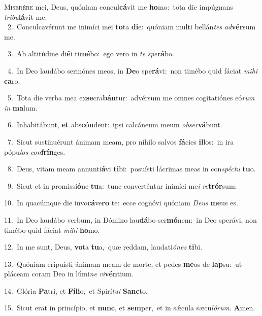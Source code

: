 \lettrine{\initial\textcolor{\initialcolor}{M}}{iserére} mei, Deus, quóniam concul\-\textbf{cá}\-vit me \textbf{ho}\-mo:~\star tota die impúgnans \textit{tri}\-\textit{bu}\textbf{lá}vit me.\\
{\numbfont\textcolor{\numbcolor}{~2.}}~Conculcavérunt me inimíci mei \textbf{to}\-ta \textbf{di}\-e:~\star quóniam multi bellán\textit{tes} \textit{ad}\-\textbf{vér}sum me.\par
{\numbfont\textcolor{\numbcolor}{~3.}}~Ab altitúdine di\-\textbf{é}\-i ti\-\textbf{mé}\-bo:~\star ego vero in \textit{te} \textit{spe}\-\textbf{rá}bo.\par
{\numbfont\textcolor{\numbcolor}{~4.}}~In Deo laudábo sermónes meos, in \textbf{De}\-o spe\-\textbf{rá}\-vi:~\star non timébo quid fáciat \textit{mi}\-\textit{hi} \textbf{ca}\-ro.\par
{\numbfont\textcolor{\numbcolor}{~5.}}~Tota die verba mea ex\-\textbf{se}\-cra\-\textbf{bán}\-tur:~\star advérsum me omnes cogitatiónes eó\textit{rum} \textit{in} \textbf{ma}\-lum.\par
{\numbfont\textcolor{\numbcolor}{~6.}}~Inhabitábunt, \textbf{et} abs\-\textbf{cón}\-dent:~\star ipsi calcáneum meum \textit{ob}\-\textit{ser}\textbf{vá}bunt.\par
{\numbfont\textcolor{\numbcolor}{~7.}}~Sicut sustinuérunt ánimam meam, pro níhilo salvos \textbf{fá}\-cies \textbf{il}\-los:~\star in ira pópu\textit{los} \textit{con}\-\textbf{frín}ges.\par
{\numbfont\textcolor{\numbcolor}{~8.}}~Deus, vitam meam annunti\-\textbf{á}\-vi \textbf{ti}\-bi:~\star posuísti lácrimas meas in con\-\textit{spéc}\-\textit{tu} \textbf{tu}\-o.\par
{\numbfont\textcolor{\numbcolor}{~9.}}~Sicut et in promissi\-\textbf{ó}\-ne \textbf{tu}\-a:~\star tunc converténtur inimíci me\textit{i} \textit{re}\-\textbf{trór}sum:\par
{\numbfont\textcolor{\numbcolor}{10.}}~In quacúmque die invo\-\textbf{cá}\-ve\textbf{ro} te:~\star ecce cognóvi quóniam \textit{De}\-\textit{us} \textbf{me}\-us es.\par
{\numbfont\textcolor{\numbcolor}{11.}}~In Deo laudábo verbum, in Dómino lau\-\textbf{dá}\-bo ser\-\textbf{mó}\-nem:~\star in Deo sperávi, non timébo quid fáciat \textit{mi}\-\textit{hi} \textbf{ho}\-mo.\par
{\numbfont\textcolor{\numbcolor}{12.}}~In me sunt, Deus, \textbf{vo}\-ta \textbf{tu}\-a,~\star quæ reddam, laudati\-\textit{ó}\-\textit{nes} \textbf{ti}\-bi.\par
{\numbfont\textcolor{\numbcolor}{13.}}~Quóniam eripuísti ánimam meam de morte, et pedes \textbf{me}\-os de \textbf{lap}\-su:~\star ut pláceam coram Deo in lúmi\textit{ne} \textit{vi}\-\textbf{vén}tium.\par
{\numbfont\textcolor{\numbcolor}{14.}}~Glória \textbf{Pa}\-tri, et \textbf{Fí}\-\textbf{li}o,~\star et Spirí\-\textit{tu}\-\textit{i} \textbf{Sanc}\-to.\par
{\numbfont\textcolor{\numbcolor}{15.}}~Sicut erat in princípio, et \textbf{nunc}\-, et \textbf{sem}\-per,~\star et in sǽcula sæcu\-\textit{ló}\-\textit{rum}. \textbf{A}\-men.\par
